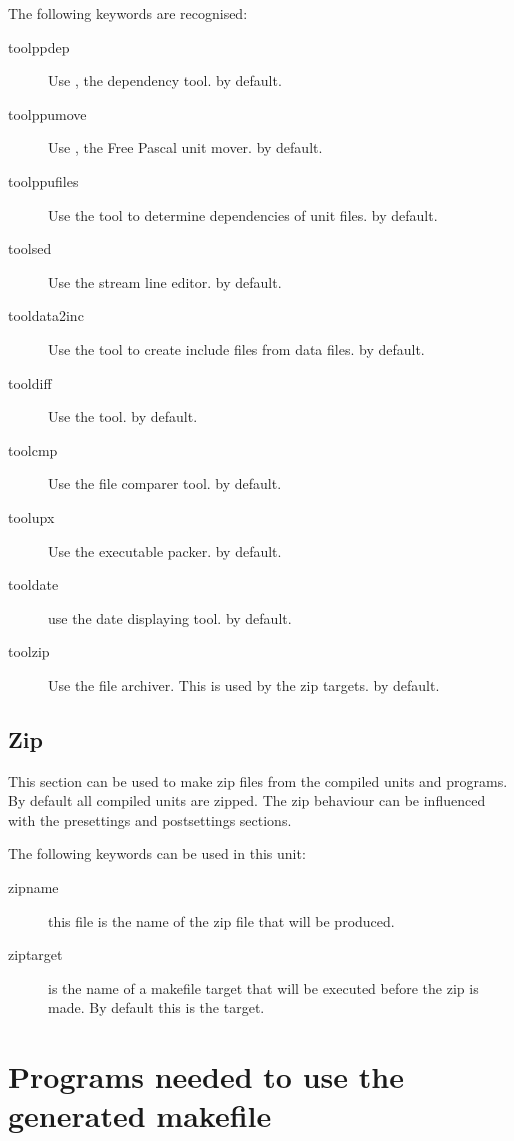 The following keywords are recognised:
\begin{description}
\item[toolppdep]
Use , the dependency tool.  by default.
\item[toolppumove]
Use , the Free Pascal unit mover.  by default.
\item[toolppufiles]
Use the  tool to determine dependencies of unit files.
 by default.
\item[toolsed]
Use  the stream line editor.  by default.
\item[tooldata2inc]
Use the  tool to create include files from data files.
 by default.
\item[tooldiff]
Use the \gnu {} tool.  by default.
\item[toolcmp]
Use the  file comparer tool.  by default.
\item[toolupx]
Use the  executable packer. by default.
\item[tooldate]
use the  date displaying tool.  by default.
\item[toolzip]
Use the  file archiver. This is used by the zip targets.
 by default.
\end{description}

\subsection{Zip}
This section can be used to make zip files from the compiled units and
programs. By default all compiled units are zipped. The zip behaviour can
be influenced with the presettings and postsettings sections.

The following keywords can be used in this unit:
\begin{description}
\item[zipname]
this file is the name of the zip file that will be produced.
\item[ziptarget]
is the name of a makefile target that will be executed before the zip is
made. By default this is the   target.
\end{description}

\section{Programs needed to use the generated makefile}

